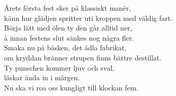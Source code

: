 \documentclass[a6paper,10pt]{article}
\begin{document}
\setlength{\oddsidemargin}{-0.47in}
\noindent
\begin{center}
\end{center}
\begin{lyrics}
Årets första fest sker på klassiskt manér,\\
känn hur glädjen spritter uti kroppen med väldig fart.\\
Börja lätt med ölen ty den går alltid ner,\\
å innan festens slut sänkes nog några fler.
\vspace{5pt}\\
Smaka nu på bäsken, det ädla fabrikat,\\
om kryddan bränner strupen finns bättre destillat.\\
Ty punschen kommer ljuv och sval,\\
läskar ända in i märgen.\\
Nu ska vi roa oss kungligt till klockan fem.
\end{lyrics}
\begin{center}
\end{center}
\end{document}
